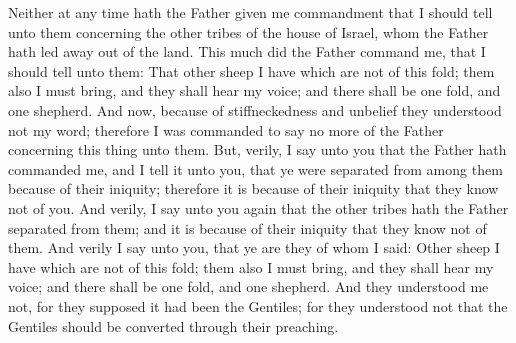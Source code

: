 Neither at any time hath the Father given me commandment that I should tell unto them concerning the other tribes of the house of Israel, whom the Father hath led away out of the land.
\bverse \iffalse This much did the Father command me, that I should tell unto them: \fi
This much did the Father command me, that I should tell unto them:
\bverse \iffalse That other sheep I have which are not of this fold; them also I must bring, and they shall hear my voice; and there shall be one fold, and one shepherd. \fi
That other sheep I have which are not of this fold; them also I must bring, and they shall hear my voice; and there shall be one fold, and one shepherd.
\bverse \iffalse And now, because of stiffneckedness and unbelief they understood not my word; therefore I was commanded to say no more of the Father concerning this thing unto them. \fi
And now, because of stiffneckedness and unbelief they understood not my word; therefore I was commanded to say no more of the Father concerning this thing unto them.
\bverse \iffalse But, verily, I say unto you that the Father hath commanded me, and I tell it unto you, that ye were separated from among them because of their iniquity; therefore it is because of their iniquity that they know not of you. \fi
But, verily, I say unto you that the Father hath commanded me, and I tell it unto you, that ye were separated from among them because of their iniquity; therefore it is because of their iniquity that they know not of you.
\bverse \iffalse And verily, I say unto you again that the other tribes hath the Father separated from them; and it is because of their iniquity that they know not of them. \fi
And verily, I say unto you again that the other tribes hath the Father separated from them; and it is because of their iniquity that they know not of them.
\bverse \iffalse And verily I say unto you, that ye are they of whom I said: Other sheep I have which are not of this fold; them also I must bring, and they shall hear my voice; and there shall be one fold, and one shepherd. \fi
And verily I say unto you, that ye are they of whom I said: Other sheep I have which are not of this fold; them also I must bring, and they shall hear my voice; and there shall be one fold, and one shepherd.
\bverse \iffalse And they understood me not, for they supposed it had been the Gentiles; for they understood not that the Gentiles should be converted through their preaching. \fi
And they understood me not, for they supposed it had been the Gentiles; for they understood not that the Gentiles should be converted through their preaching.
